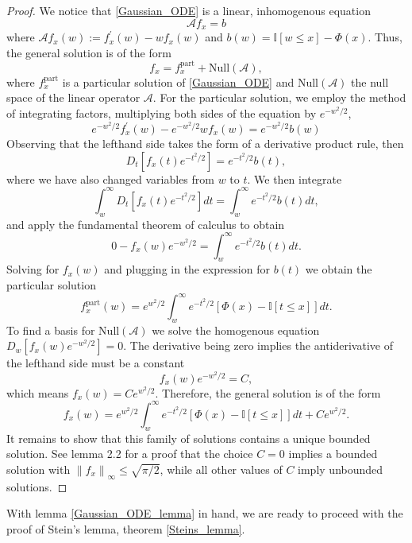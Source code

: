 \documentclass[12pt]{article}
\newcommand{\indicator}[1]{\mathbb{I}[#1]}
\newcommand*{\norm}[1]{\left\lVert#1\right\rVert}
\newcommand{\GaussianCDF}{\Phi}
\newcommand{\steinOperator}{\mathcal{A}}
\begin{document}
\begin{proof} 
We notice that \ref{Gaussian_ODE} is a linear, inhomogenous equation
\[\steinOperator f_x = b\]
where $\steinOperator f_x(w) := f_x^\prime(w) - w f_x(w)$ and $b(w) = \indicator{w \leq x} - \GaussianCDF(x)$. 
Thus, the general solution is of the form 
\[f_x = f_x^{\text{part}} + \text{Null}(\steinOperator),\]
where $f_x^{\text{part}}$ is a particular solution of \ref{Gaussian_ODE} and $\text{Null}(\steinOperator)$ the null space of the linear operator $\steinOperator$. 
For the particular solution, we employ the method of integrating factors, multiplying both sides of the equation by $e^{-w^2/2}$,
\[
e^{-w^2/2} f_x^\prime(w) - e^{-w^2/2} wf_x(w) = e^{-w^2/2} b(w)
\]
Observing that the lefthand side takes the form of a derivative product rule, then 
\[
D_{t} \left[f_x(t) e^{-t^2/2} \right] = e^{-t^2/2} b(t),
\] 
where we have also changed variables from $w$ to $t$. We then integrate 
\[
\int_{w}^{\infty} D_{t} \left[f_x(t) e^{-t^2/2} \right] dt = \int_{w}^{\infty} e^{-t^2/2} b(t) dt,
\]
and apply the fundamental theorem of calculus to obtain 
\[
0 - f_x(w) e^{-w^2/2} = \int_{w}^{\infty} e^{-t^2/2} b(t) dt.
\]
Solving for $f_x(w)$ and plugging in the expression for $b(t)$ we obtain the particular solution 
\[
f_x^{\text{part}}(w) = e^{w^2/2} \int_{w}^{\infty} e^{-t^2/2} \left[\GaussianCDF(x) - \indicator{t \leq x}\right] dt.
\]
To find a basis for $\text{Null}(\steinOperator)$ we solve the homogenous equation $D_{w} \left[f_x(w) e^{-w^2/2} \right] = 0$. The derivative being zero implies the 
antiderivative of the lefthand side must be a constant 
\[
f_x(w) e^{-w^2/2} = C,
\]
which means $f_x(w) = C e^{w^2/2}$. Therefore, the general solution is of the form 
\[
f_x(w) = e^{w^2/2} \int_{w}^{\infty} e^{-t^2/2} \left[\GaussianCDF(x) - \indicator{t \leq x}\right] dt + C e^{w^2/2}.
\]
It remains to show that this family of solutions contains a unique bounded solution. See \cite{Ross} lemma 2.2 for a proof that the choice $C = 0$ implies 
a bounded solution with $\norm{f_x}_{\infty} \leq \sqrt{\pi/2}$, while all other values of $C$ imply unbounded solutions. 
\end{proof}

With lemma \ref{Gaussian_ODE_lemma} in hand, we are ready to proceed with the proof of Stein's lemma, theorem \ref{Steins_lemma}. 
\end{document}
